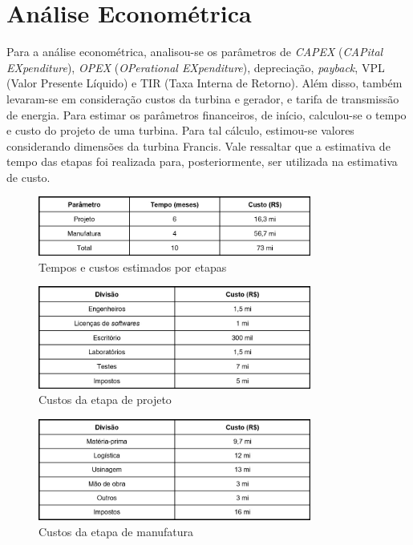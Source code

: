 \chapter{Análise Econométrica}\label{chp:econometrics}

Para a análise econométrica, analisou-se os parâmetros de \textit{CAPEX} (\textit{CAPital EXpenditure}), \textit{OPEX} (\textit{OPerational EXpenditure}), depreciação, \textit{payback}, VPL (Valor Presente Líquido) e TIR (Taxa Interna de Retorno). Além disso, também levaram-se em consideração custos da turbina e gerador, e tarifa de transmissão de energia.
Para estimar os parâmetros financeiros, de início, calculou-se o tempo e custo do projeto de uma turbina. Para tal cálculo, estimou-se valores considerando dimensões da turbina Francis. Vale ressaltar que a estimativa de tempo das etapas foi realizada para, posteriormente, ser utilizada na estimativa de custo.

\begin{figure}[!ht]
    \centering
    \includegraphics[width=0.8\textwidth]{figuras/tabela1.jpeg}
    \caption{Tempos e custos estimados por etapas}
    \label{fig:tab1}
\end{figure}

\begin{figure}[!ht]
    \centering
    \includegraphics[width=0.8\textwidth]{figuras/tabela2.jpeg}
    \caption{Custos da etapa de projeto}
    \label{fig:tab2}
\end{figure}

\begin{figure}[!ht]
    \centering
    \includegraphics[width=0.8\textwidth]{figuras/tabela3.jpeg}
    \caption{Custos da etapa de manufatura}
    \label{fig:tab3}
\end{figure}

